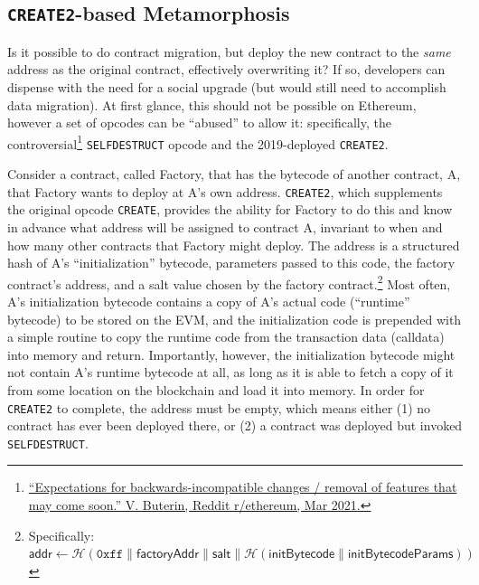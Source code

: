  

\subsection{\texttt{CREATE2}-based Metamorphosis}
\label{sec:metamorphic}

Is it possible to do contract migration, but deploy the new contract to the \textit{same} address as the original contract, effectively overwriting it? If so, developers can dispense with the need for a social upgrade (but would still need to accomplish data migration). At first glance, this should not be possible on Ethereum, however a set of opcodes can be ``abused'' to allow it: specifically, the controversial\footnote{\href{https://www.reddit.com/r/ethereum/comments/lx32kv/expectations\_for\_backwardsincompatible\_changes/}{``Expectations for backwards-incompatible changes / removal of features that may come soon.'' V. Buterin, Reddit r/ethereum, Mar 2021.}} \texttt{SELFDESTRUCT} opcode and the 2019-deployed \texttt{CREATE2}. 

Consider a contract, called Factory, that has the bytecode of another contract, A, that Factory wants to deploy at A's own address. \texttt{CREATE2}, which supplements the original opcode \texttt{CREATE}, provides the ability for Factory to do this and know in advance what address will be assigned to contract A, invariant to when and how many other contracts that Factory might deploy.  The address is a structured hash of A's ``initialization'' bytecode, parameters passed to this code, the factory contract's address, and a salt value chosen by the factory contract.\footnote{Specifically: $\mathsf{addr} \leftarrow \mathcal{H}(\mathtt{0xff} \| \mathsf{factoryAddr} \| \mathsf{salt} \| \mathcal{H} (\mathsf{initBytecode} \| \mathsf{initBytecodeParams}))$} Most often, A's initialization bytecode contains a copy of A's actual code (``runtime'' bytecode) to be stored on the EVM, and the initialization code is prepended with a simple routine to copy the runtime code from the transaction data (calldata) into memory and return. Importantly, however, the initialization bytecode might not contain A's runtime bytecode at all, as long as it is able to fetch a copy of it from some location on the blockchain and load it into memory. In order for \texttt{CREATE2} to complete, the address must be empty, which means either (1) no contract has ever been deployed there, or (2) a contract was deployed but invoked \texttt{SELFDESTRUCT}.

